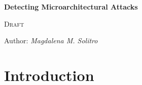 \documentclass[12pt,a4paper]{book}
\theoremstyle{definition}
\begin{document}
	
	\begin{titlepage}
		\begin{center}
			\vspace*{1cm}
			
			\Huge
			\textbf{\Huge Detecting Microarchitectural Attacks}
			
			\vspace{0.3cm}
			\LARGE \textsc{Draft}
			
			\vspace{1.5cm}
			
			\large Author: \textit{Magdalena M. Solitro}
			
			\vfill
		\end{center}
	\end{titlepage}
	
	\tableofcontents
	
	\mainmatter
	
	\chapter{Introduction}
	
\end{document}
